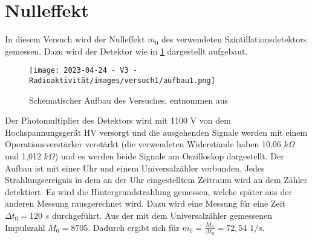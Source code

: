 \documentclass[../protokoll.tex]{subfiles}
\begin{document}
\section{Nulleffekt}\label{sec:Nulleffekt}
In diesem Versuch wird der Nulleffekt $m_0$ des verwendeten Szintillationsdetektors gemessen. Dazu wird der Detektor wie in \ref{aufbau1} dargestellt aufgebaut.
\begin{figure}[h]
    \centering
    \texttt{[image: 2023-04-24 - V3 - Radioaktivität/images/versuch1/aufbau1.png]}
    \caption{Schematischer Aufbau des Versuches, entnommen aus \cite{script}}
    \label{aufbau1}
\end{figure}
Der Photomultiplier des Detektors wird mit 1100 V von dem Hochspannungsgerät HV versorgt und die ausgehenden Signale werden mit einem Operationsverstärker verstärkt (die verwendeten Widerstände haben 10,06 $k\Omega$ und 1,012 $k\Omega$) und es werden beide Signale am Oszilloskop dargestellt. Der Aufbau ist mit einer Uhr und einem Universalzähler verbunden. Jedes Strahlungsereignis in dem an der Uhr eingestelltem Zeitraum wird an dem Zähler detektiert. Es wird die Hintergrundstrahlung gemessen, welche später aus der anderen Messung rausgerechnet wird. Dazu wird eine Messung für eine Zeit $\Delta t_0=120$ $s$ durchgeführt. Aus der mit dem Universalzähler gemessenen Impulszahl $M_0=8705$. Dadurch ergibt sich für $m_0=\frac{M_0}{\Delta t_0}=72,54$ $1/s$.
\end{document}
